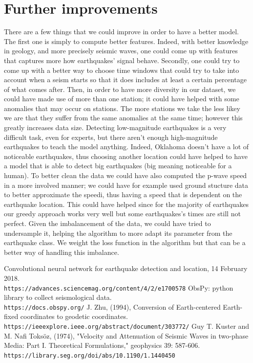 \documentclass[10pt,conference,compsocconf]{IEEEtran}
\begin{document}
\section{Further improvements}
There are a few things that we could improve in order to have a better model. The first one is simply to compute better features. Indeed, with better knowledge in geology, and more precisely seismic waves, one could come up with features that captures more how earthquakes' signal behave. Secondly, one could try to come up with a better way to choose time windows that could try to take into account when a seism starts so that it does includes at least a certain percentage of what comes after. Then, in order to have more diversity in our dataset, we could have made use of more than one station; it could have helped with some anomalies that may occur on stations. The more stations we take the less likey we are that they suffer from the same anomalies at the same time; however this greatly increases data size. Detecting low-magnitude earthquakes is a very difficult task, even for experts, but there aren't enough high-magnitude earthquakes to teach the model anything. Indeed, Oklahoma doesn't have a lot of noticeable earthquakes, thus choosing another location could have helped to have a model that is able to detect big earthquakes (big meaning noticeable for a human). To better clean the data we could have also computed the p-wave speed in a more involved manner; we could have for example used ground stucture data to better approximate the speedi, thus having a speed that is dependent on the earthquake location. This could have helped since for the majority of earthquakes our greedy approach works very well but some earthquakes's times are still not perfect. Given the imbalancement of the data, we could have tried to undersample it, helping the algorithm to more adapt its parameter from the earthquake class. We weight the loss function in the algorithm but that can be a better way of handling this imbalance.

\begin{thebibliography}{9}
Convolutional neural network for earthquake detection and location, 14 February 2018. \\\texttt{https://advances.sciencemag.org/content/4/2/e1700578}
ObsPy: python library to collect seismological data.
\\\texttt{https://docs.obspy.org/}
J. Zhu, (1994),  Conversion of Earth-centered Earth-fixed coordinates to geodetic coordinates. \\\texttt{https://ieeexplore.ieee.org/abstract/document/303772/}
Guy T. Kuster and M. Nafi Toksöz, (1974), "Velocity and Attenuation of Seismic Waves in two‐phase Media: Part I. Theoretical Formulations," geophysics 39: 587-606. \\\texttt{https://library.seg.org/doi/abs/10.1190/1.1440450}
\end{thebibliography}
\end{document}
